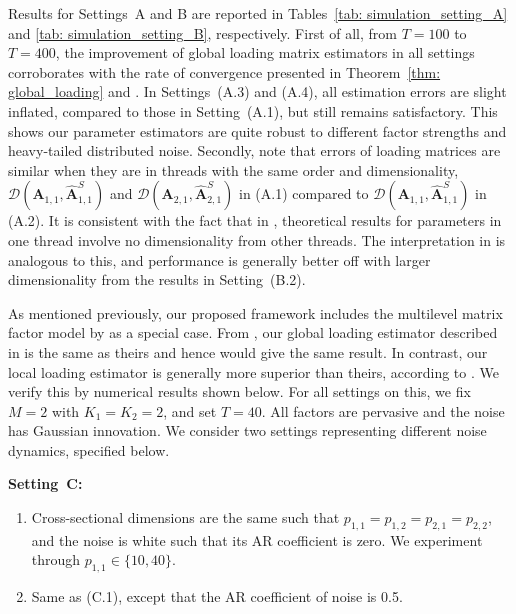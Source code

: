 \documentclass[aos]{imsart}
\theoremstyle{plain}
\theoremstyle{definition}
\def\wh#1{\widehat{#1}}
\def\cD{\mathcal{D}}
\def\bA{\mathbf{A}}
\begin{document}
Results for Settings~A and B are reported in Tables~\ref{tab: simulation_setting_A} and \ref{tab: simulation_setting_B}, respectively. First of all, from $T=100$ to $T=400$, the improvement of global loading matrix estimators in all settings corroborates with the rate of convergence presented in Theorem~\ref{thm: global_loading} and . In Settings~(A.3) and (A.4), all estimation errors are slight inflated, compared to those in Setting~(A.1), but still remains satisfactory. This shows our parameter estimators are quite robust to different factor strengths and heavy-tailed distributed noise. Secondly, note that errors of loading matrices are similar when they are in threads with the same order and dimensionality,  $\cD(\bA_{1,1}, \wh{\bA}_{1,1}^S)$ and $\cD(\bA_{2,1}, \wh{\bA}_{2,1}^S)$ in (A.1) compared to $\cD(\bA_{1,1}, \wh{\bA}_{1,1}^S)$ in (A.2). It is consistent with the fact that in , theoretical results for parameters in one thread involve no dimensionality from other threads. The interpretation in  is analogous to this, and performance is generally better off with larger dimensionality from the results in Setting~(B.2).


As mentioned previously, our proposed framework includes the multilevel matrix factor model by \cite{Zhangetal2025} as a special case. From , our global loading estimator described in  is the same as theirs and hence would give the same result. In contrast, our local loading estimator is generally more superior than theirs, according to . We verify this by numerical results shown below. For all settings on this, we fix $M=2$ with $K_1=K_2=2$, and set $T=40$. All factors are pervasive and the noise has Gaussian innovation. We consider two settings representing different noise dynamics, specified below.

\vspace{12pt}
\noindent\textbf{Setting~C:}
\begin{enumerate}[itemsep=-1pt, parsep=0pt, topsep=0pt, label = (C.\arabic*), left=1pt]
    \item Cross-sectional dimensions are the same such that $p_{1,1}=p_{1,2}=p_{2,1}=p_{2,2}$, and the noise is white such that its AR coefficient is zero. We experiment through $p_{1,1}\in \{10, 40\}$.
    \item Same as (C.1), except that the AR coefficient of noise is 0.5.
\end{enumerate}
\vspace{12pt}
\end{document}
